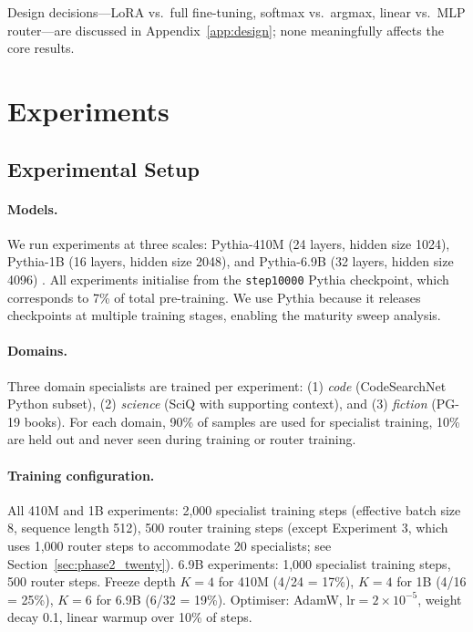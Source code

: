 \documentclass{article}
\begin{document}
Design decisions---LoRA vs.\ full fine-tuning, softmax vs.\ argmax, linear vs.\ MLP router---are discussed in Appendix~\ref{app:design}; none meaningfully affects the core results.

\section{Experiments}
\label{sec:experiments}

\subsection{Experimental Setup}
\label{sec:setup}

\paragraph{Models.} We run experiments at three scales: Pythia-410M (24 layers, hidden size 1024), Pythia-1B (16 layers, hidden size 2048), and Pythia-6.9B (32 layers, hidden size 4096) \citep{biderman2023pythia}. All experiments initialise from the \texttt{step10000} Pythia checkpoint, which corresponds to 7\% of total pre-training. We use Pythia because it releases checkpoints at multiple training stages, enabling the maturity sweep analysis.

\paragraph{Domains.} Three domain specialists are trained per experiment: (1) \emph{code} (CodeSearchNet Python subset), (2) \emph{science} (SciQ with supporting context), and (3) \emph{fiction} (PG-19 books). For each domain, 90\% of samples are used for specialist training, 10\% are held out and never seen during training or router training.

\paragraph{Training configuration.} All 410M and 1B experiments: 2,000 specialist training steps (effective batch size 8, sequence length 512), 500 router training steps (except Experiment 3, which uses 1,000 router steps to accommodate 20 specialists; see Section~\ref{sec:phase2_twenty}). 6.9B experiments: 1,000 specialist training steps, 500 router steps. Freeze depth $K=4$ for 410M (4/24 = 17\%), $K=4$ for 1B (4/16 = 25\%), $K=6$ for 6.9B (6/32 = 19\%). Optimiser: AdamW, $\text{lr}=2\times10^{-5}$, weight decay 0.1, linear warmup over 10\% of steps.
\end{document}

